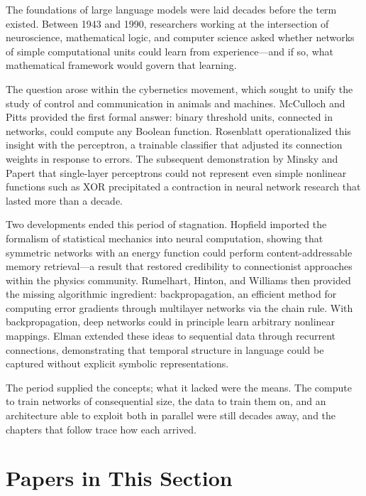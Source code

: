 
The foundations of large language models were laid decades before the term existed. Between 1943 and 1990, researchers working at the intersection of neuroscience, mathematical logic, and computer science asked whether networks of simple computational units could learn from experience---and if so, what mathematical framework would govern that learning.

The question arose within the cybernetics movement, which sought to unify the study of control and communication in animals and machines. McCulloch and Pitts provided the first formal answer: binary threshold units, connected in networks, could compute any Boolean function. Rosenblatt operationalized this insight with the perceptron, a trainable classifier that adjusted its connection weights in response to errors. The subsequent demonstration by Minsky and Papert that single-layer perceptrons could not represent even simple nonlinear functions such as XOR precipitated a contraction in neural network research that lasted more than a decade.

Two developments ended this period of stagnation. Hopfield imported the formalism of statistical mechanics into neural computation, showing that symmetric networks with an energy function could perform content-addressable memory retrieval---a result that restored credibility to connectionist approaches within the physics community. Rumelhart, Hinton, and Williams then provided the missing algorithmic ingredient: backpropagation, an efficient method for computing error gradients through multilayer networks via the chain rule. With backpropagation, deep networks could in principle learn arbitrary nonlinear mappings. Elman extended these ideas to sequential data through recurrent connections, demonstrating that temporal structure in language could be captured without explicit symbolic representations.

The period supplied the concepts; what it lacked were the means. The compute to train networks of consequential size, the data to train them on, and an architecture able to exploit both in parallel were still decades away, and the chapters that follow trace how each arrived.

\section*{Papers in This Section}

